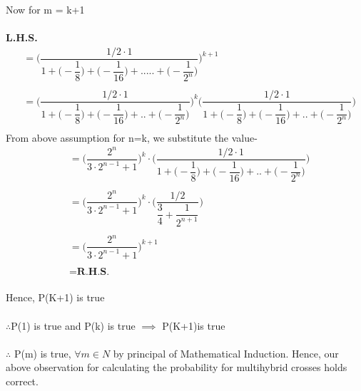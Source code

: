 \documentclass{article}
\begin{document}
\begin{itemize}
Now for m = k+1\\\\
\textbf{L.H.S.} 
\begin{align*}
&= \Bigg(\dfrac{1/2 \cdot 1}{1 + \Big(-\dfrac{1}{8}\Big) + \Big(-\dfrac{1}{16}\Big) +.....+ \Big(-\dfrac{1}{2^{n}}\Big)}\Bigg)^{k+1}\\\\
&= \Bigg(\dfrac{1/2 \cdot 1}{1 + \Big(-\dfrac{1}{8}\Big) + \Big(-\dfrac{1}{16}\Big) +..+ \Big(-\dfrac{1}{2^{n}}\Big)}\Bigg)^{k}\Bigg(\dfrac{1/2 \cdot 1}{1 + \Big(-\dfrac{1}{8}\Big) + \Big(-\dfrac{1}{16}\Big) +..+ \Big(-\dfrac{1}{2^{n}}\Big)}\Bigg)  \\ 
\end{align*}
From above assumption for n=k, we substitute the value-\\
\begin{align*}   
&= \Big(\dfrac{2^n}{3\cdot 2^{n-1} + 1}\Big)^{k}\cdot\Bigg(\dfrac{1/2 \cdot 1}{1 + \Big(-\dfrac{1}{8}\Big) + \Big(-\dfrac{1}{16}\Big) +..+ \Big(-\dfrac{1}{2^{n}}\Big)}\Bigg)\\\\   
&= \Big(\dfrac{2^n}{3\cdot 2^{n-1} + 1}\Big)^{k}\cdot \Bigg(\dfrac{1/2}{\dfrac{3}{4} + \dfrac{1}{2^{n+1}}}\Bigg)\\\\
&= \Big(\dfrac{2^n}{3\cdot 2^{n-1} + 1}\Big)^{k+1}\\\\
&= \textbf{R.H.S.}     	  
\end{align*}\\
Hence, P(K+1) is true\\\\
$ \therefore $P(1) is true and P(k) is true $ \implies $ P(K+1)is true\\\\
$ \therefore $ P(m) is true, $ \forall m \in N $ by principal of Mathematical Induction.
Hence, our above observation for calculating the probability for multihybrid crosses holds correct.
\end{itemize}
\end{document}
